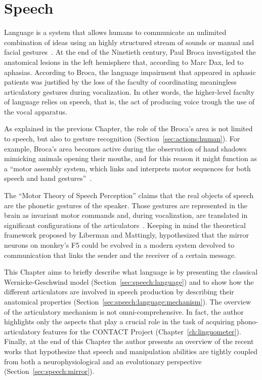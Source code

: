 \chapter{Speech}
\label{ch:speech}
Language is a system that allows humans to communicate an unlimited combination
of ideas using an highly structured stream of sounds or manual and facial
gestures~\citep{kandel.schwartz.jessel:2000}.
At the end of the Ninetieth century, Paul Broca investigated the anatomical
lesions in the left hemisphere that, according to Marc Dax, led to aphasias.
According to Broca, the language impairment that appeared in aphasic patients
was justified by the loss of the faculty of coordinating meaningless
articulatory gestures during vocalization.
In other words, the higher-level faculty of language relies on speech, that is,
the act of producing voice trough the use of the vocal apparatus.

As explained in the previous Chapter, the role of the Broca's area is not
limited to speech, but also to gesture recognition
(Section~\ref{sec:actions:human}).
For example, Broca's area becomes active during the observation of hand shadows 
mimicking animals opening their mouths, and for this reason it might function as
a ``motor assembly system, which links and interprets motor sequences for
both speech and hand gestures''~\citep{fadiga.etal:2006}.

The ``Motor Theory of Speech Perception'' claims that the real objects of speech
are the phonetic gestures of the speaker.
Those gestures are represented in the brain as invariant motor commands and,
during vocalization, are translated in significant configurations of the
articulators~\citep{liberman.mattingly:1985}.
Keeping in mind the theoretical framework proposed by Liberman and Mattingly, 
\citet{rizzolatti.arbib:1998} hypothesized that the mirror neurons on monkey's
F5 could be evolved in a
modern system devolved to communication that links the sender and the receiver
of a certain message.

This Chapter aims to briefly describe what language is by presenting the
classical Wernicke-Geschwind model 
(Section~\ref{sec:speech:language}) and to show how the
different articulators are involved in speech production by describing their 
anatomical properties (Section~\ref{sec:speech:language:mechanism}).
The overview of the articulatory mechanism is not omni-comprehensive. In fact,
the author highlights only the aspects that play a crucial role in the task of
acquiring phono-articulatory features for the CONTACT Project
(Chapter~\ref{ch:linguometer}).
Finally, at the end of this Chapter the author presents an overview of the 
recent works that hypothesize that speech and manipulation abilities
are tightly coupled from both a neurophysiological and an evolutionary
perspective (Section~\ref{sec:speech:mirror}).
